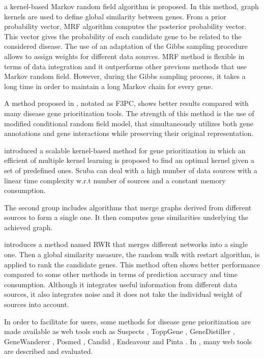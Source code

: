 \cite{mrf} a kernel-based Markov random field algorithm is proposed. In this method, graph kernels are used to define global similarity between genes. From a prior probability vector, MRF algorithm computes the posterior probability vector. This vector gives the probability of each candidate gene to be related to the considered disease. The use of an adaptation of the Gibbs sampling procedure allows to assign weights for different data sources. MRF method is flexible in terms of data integration and it outperforms other previous methods that use Markov random field. However, during the Gibbs sampling process, it takes a long time in order to maintain a long Markov chain for every gene. 

A method proposed in \cite{f3pc}, notated as F3PC, shows better results compared with many disease gene prioritization tools. The strength of this method is the use of modified conditional random field model, that simultaneously utilizes both gene annotations and gene interactions while preserving their original representation. 

\cite{scuba} introduced a scalable kernel-based method for gene prioritization in which an efficient of multiple kernel learning is proposed to find an optimal kernel given a set of predefined ones. Scuba can deal with a high number of data sources with a linear time complexity w.r.t number of sources and a constant memory consumption.

The second group includes algorithms that merge graphs derived from different sources to form a single one. It then computes gene similarities underlying the achieved graph.

\cite{rwr} introduces a method named RWR that merges different networks into a single one. Then a global similarity measure, the random walk with restart algorithm, is applied to rank the candidate genes. This method often shows better performance compared to some other methods in terms of prediction accuracy and time consumption. Although it integrates useful information from different data sources, it also integrates noise and it does not take the individual weight of sources into account.

In order to facilitate for users, some methods for disease gene prioritization are made available as web tools such as Suspects \cite{suspect}, ToppGene \cite{toppgene}, GeneDistiller \cite{genedistiller}, GeneWanderer \cite{genewanderer}, Posmed \cite{posmed}, Candid \cite{candid}, Endeavour \cite{endeavour} and Pinta \cite{pinta}. In \cite{unbiased_evaluation}, many web tools are described and evaluated. 

